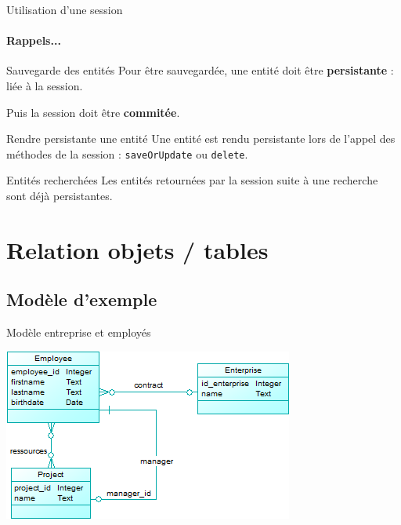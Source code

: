 \documentclass[compact]{beamer}%
\begin{document}
\begin{frame}{Utilisation d'une session}
	\framesubtitle{Rappels...}
	
	\begin{block}{Sauvegarde des entités}
	Pour être sauvegardée, une entité doit être \textbf{persistante} : liée à la session.\par
	Puis la session doit être \textbf{commitée}.
	\end{block}
	
	\pause
	\begin{block}{Rendre persistante une entité}
	Une entité est rendu persistante lors de l'appel des méthodes de la session : \texttt{saveOrUpdate} ou \texttt{delete}.
	\end{block}
	
	\pause
	\begin{block}{Entités recherchées}
	Les entités retournées par la session suite à une recherche sont déjà persistantes.
	\end{block}	
\end{frame}
	
\section{Relation objets / tables}

\subsection{Modèle d'exemple}

\begin{frame}{Modèle entreprise et employés}
	\begin{center}
	\includegraphics{images/model_employees_full.png}	
	\end{center}
\end{frame}
\end{document}
